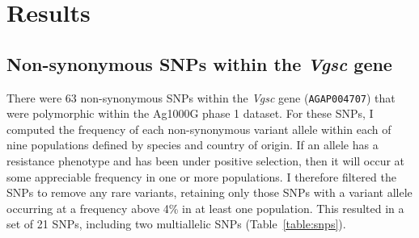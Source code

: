 \documentclass[a4paper,11pt,abstracton,hidelinks]{scrartcl}
\begin{document}
\section{Results}\label{sec:results}


\subsection{Non-synonymous SNPs within the \textit{Vgsc} gene}\label{subsec:results-snps}


There were 63 non-synonymous SNPs within the \textit{Vgsc} gene (\texttt{AGAP004707}) that were polymorphic within the Ag1000G phase 1 dataset.
%
For these SNPs, I computed the frequency of each non-synonymous variant allele within each of nine populations defined by species and country of origin.
%
If an allele has a resistance phenotype and has been under positive selection, then it will occur at some appreciable frequency in one or more populations.
%
I therefore filtered the SNPs to remove any rare variants, retaining only those SNPs with a variant allele occurring at a frequency above 4\% in at least one population.
%
This resulted in a set of 21 SNPs, including two multiallelic SNPs (Table~\ref{table:snps}).
\end{document}
